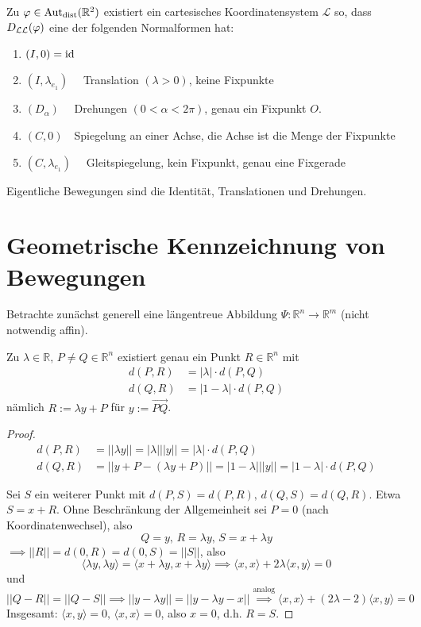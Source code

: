 \documentclass[parskip,a4paper,twoside,DIV15,BCOR12mm]{scrbook}
\begin{document}
\begin{theo}
\label{Satz 22.2}
Zu \(\varphi\in\operatorname{Aut_{dist}}(\mathbb{R}^{2})\) existiert ein cartesisches 
Koordinatensystem \(\mathcal{L}\) so, dass \(D_{\mathcal{L}\mathcal{L}}(\varphi)\)
eine der folgenden Normalformen hat:
\begin{enumerate}
\item\((I,0) = \operatorname{id}\)
\item\((I,\lambda_{e_{1}})\quad\) Translation \((\lambda > 0)\), keine Fixpunkte
\item\((D_{\alpha})\quad\) Drehungen \((0<\alpha<2\pi)\), genau ein Fixpunkt 
\(O\).
\item\((C,0)\quad\)Spiegelung an einer Achse, die Achse ist die Menge der 
Fixpunkte
\item\((C,\lambda_{e_{1}})\quad\) Gleitspiegelung, kein Fixpunkt, genau eine
Fixgerade
\end{enumerate}
Eigentliche Bewegungen sind die Identität, Translationen und Drehungen.
\end{theo}

\section{Geometrische Kennzeichnung von Bewegungen}

Betrachte zunächst generell eine längentreue Abbildung 
\(\Psi:\mathbb{R}^{n}\to\mathbb{R}^{m}\) (nicht notwendig affin).
\begin{lemma}
Zu \(\lambda\in\mathbb{R},\,P\neq Q\in\mathbb{R}^{n}\) existiert genau ein
Punkt \(R\in\mathbb{R}^{n}\) mit
\begin{align*}
d(P,R)&=|\lambda|\cdot d(P,Q)\\
d(Q,R)&=|1-\lambda|\cdot d(P,Q)
\end{align*}
nämlich \(R:=\lambda y+P\) für \(y:=\overrightarrow{PQ}\).
\end{lemma}
\begin{proof}
\begin{align*}
d(P,R)&=||\lambda y|| = |\lambda|||y||=|\lambda|\cdot d(P,Q)\\
d(Q,R)&=||y+P-(\lambda y + P)||=|1-\lambda|||y||=|1-\lambda|\cdot d(P,Q)
\end{align*}

Sei \(S\) ein weiterer Punkt mit \(d(P,S)=d(P,R),\,d(Q,S)=d(Q,R)\). Etwa
\(S=x+R\).
Ohne Beschränkung der Allgemeinheit sei \(P=0\) (nach Koordinatenwechsel),
also
\[
Q=y,\,R=\lambda y,\,S=x+\lambda y
\]
\(\implies ||R||=d(0,R)=d(0,S)=||S||\), also 
\[
\langle\lambda y,\lambda y\rangle = \langle x+\lambda y,x+\lambda y\rangle
\implies\langle x,x\rangle+2\lambda\langle x,y\rangle =0
\]
und
\[
||Q-R||=||Q-S||\implies ||y-\lambda y||=||y-\lambda y-x|| 
\overset{\text{analog}}{\implies}
\langle x,x\rangle+(2\lambda -2)\langle x,y\rangle =0
\]
Insgesamt: \(\langle x,y\rangle =0,\,\langle x,x\rangle=0\), also \(x=0\), d.h.
\(R=S\).
\end{proof}
\end{document}
